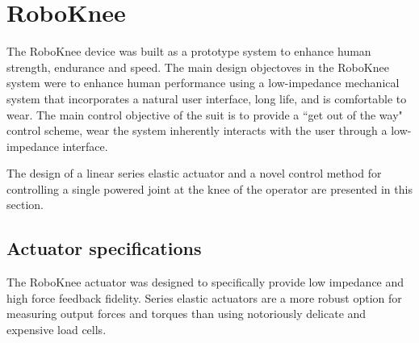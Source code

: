 



% 
\section{RoboKnee}

The RoboKnee device was built as a prototype system to enhance human strength, endurance and speed.  The main design objectoves in the RoboKnee system were to enhance human performance using a low-impedance mechanical system that incorporates a natural user interface, long life, and is comfortable to wear.  The main control objective of the suit is to provide a ``get out of the way" control scheme, wear the system inherently interacts with the user through a low-impedance interface.  

The design of a linear series elastic actuator and a novel control method for controlling a single powered joint at the knee of the operator are presented in this section.

\subsection{Actuator specifications}

The RoboKnee actuator was designed to specifically provide low impedance and high force feedback fidelity.  Series elastic actuators are a more robust option for measuring output forces and torques than using notoriously delicate and expensive load cells.  


